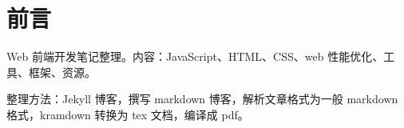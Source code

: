 \chapter{前言}

Web 前端开发笔记整理。内容：JavaScript、HTML、CSS、web 性能优化、工具、框架、资源。

整理方法：Jekyll 博客，撰写 markdown 博客，解析文章格式为一般 markdown 格式，kramdown 转换为 tex 文档，编译成 pdf。